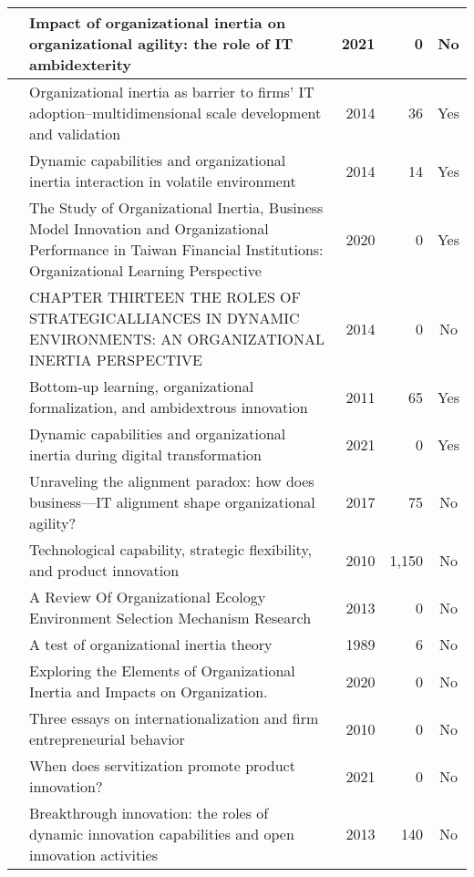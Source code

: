 \begin{longtable}{
    |>{\raggedright\arraybackslash}p{3.7cm}
    |>{\raggedright\arraybackslash}p{3.7cm}
    |r
    |r
    |c
    |}
	\cite{zhen2021impact} & Impact of organizational inertia on organizational agility: the role of IT ambidexterity & 2021 & 0 & No \\
	\hline 
	\cite{haag2014organizational} & Organizational inertia as barrier to firms' IT adoption–multidimensional scale development and validation & 2014 & 36 & Yes \\
	\hline 
	\cite{nedzinskas2014dynamic} & Dynamic capabilities and organizational inertia interaction in volatile environment & 2014 & 14 & Yes \\
	\hline 
	\cite{jui2020study} & The Study of Organizational Inertia, Business Model Innovation and Organizational Performance in Taiwan Financial Institutions: Organizational Learning Perspective & 2020 & 0 & Yes \\
	\hline 
	\cite{qian2014chapter} & CHAPTER THIRTEEN THE ROLES OF STRATEGICALLIANCES IN DYNAMIC ENVIRONMENTS: AN ORGANIZATIONAL INERTIA PERSPECTIVE & 2014 & 0 & No \\
	\hline 
	\cite{wei2011bottom} & Bottom‐up learning, organizational formalization, and ambidextrous innovation & 2011 & 65 & Yes \\
	\hline 
	\cite{airikkala2021dynamic} & Dynamic capabilities and organizational inertia during digital transformation & 2021 & 0 & Yes \\
	\hline 
	\cite{liang2017unraveling} & Unraveling the alignment paradox: how does business—IT alignment shape organizational agility? & 2017 & 75 & No \\
	\hline 
	\cite{zhou2010technological} & Technological capability, strategic flexibility, and product innovation & 2010 & 1,150 & No \\
	\hline 
	\cite{liu2013review} & A Review Of Organizational Ecology Environment Selection Mechanism Research & 2013 & 0 & No \\
	\hline 
	\cite{kelly1989test} & A test of organizational inertia theory & 1989 & 6 & No \\
	\hline
	\cite{yusof2020exploring} & Exploring the Elements of Organizational Inertia and Impacts on Organization. & 2020 & 0 & No \\
	\hline
	\cite{mezzour2010three} & Three essays on internationalization and firm entrepreneurial behavior & 2010 & 0 & No \\
	\hline
	\cite{huang2021does} & When does servitization promote product innovation? & 2021 & 0 & No \\
	\hline
	\cite{cheng2013breakthrough} & Breakthrough innovation: the roles of dynamic innovation capabilities and open innovation activities & 2013 & 140 & No \\

\end{longtable}
